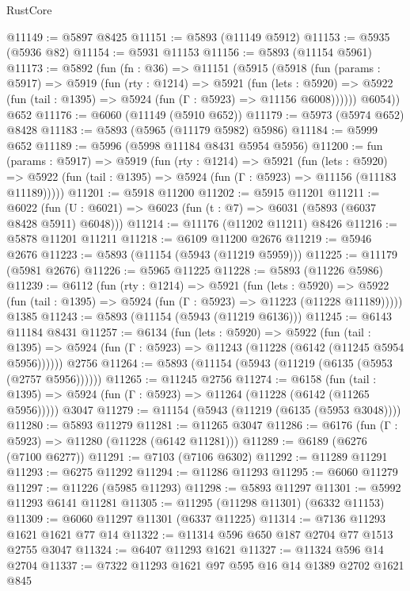 \begin{lexlean}{RustCore}
\begin{coremodule}
@11149 := @5897 @8425
@11151 := @5893 (@11149 @5912)
@11153 := @5935 (@5936 @82)
@11154 := @5931 @11153
@11156 := @5893 (@11154 @5961)
@11173 := @5892
    (fun (fn : @36) =>
    @11151
      (@5915
        (@5918
          (fun (params : @5917) =>
          @5919
            (fun (rty : @1214) =>
            @5921
              (fun (lets : @5920) =>
              @5922 (fun (tail : @1395) => @5924 (fun (Γ : @5923) => @11156 @6008))))))
        @6054))
    @652
@11176 := @6060 (@11149 (@5910 @652))
@11179 := @5973 (@5974 @652) @8428
@11183 := @5893 (@5965 (@11179 @5982) @5986)
@11184 := @5999 @652
@11189 := @5996 (@5998 @11184 @8431 @5954 @5956)
@11200 := fun (params : @5917) =>
  @5919
    (fun (rty : @1214) =>
    @5921
      (fun (lets : @5920) =>
      @5922 (fun (tail : @1395) => @5924 (fun (Γ : @5923) => @11156 (@11183 @11189)))))
@11201 := @5918 @11200
@11202 := @5915 @11201
@11211 := @6022 (fun (U : @6021) => @6023 (fun (t : @7) => @6031 (@5893 (@6037 @8428 @5911) @6048)))
@11214 := @11176 (@11202 @11211) @8426
@11216 := @5878 @11201 @11211
@11218 := @6109 @11200 @2676
@11219 := @5946 @2676
@11223 := @5893 (@11154 (@5943 (@11219 @5959)))
@11225 := @11179 (@5981 @2676)
@11226 := @5965 @11225
@11228 := @5893 (@11226 @5986)
@11239 := @6112
    (fun (rty : @1214) =>
    @5921
      (fun (lets : @5920) =>
      @5922 (fun (tail : @1395) => @5924 (fun (Γ : @5923) => @11223 (@11228 @11189)))))
    @1385
@11243 := @5893 (@11154 (@5943 (@11219 @6136)))
@11245 := @6143 @11184 @8431
@11257 := @6134
    (fun (lets : @5920) =>
    @5922
      (fun (tail : @1395) =>
      @5924 (fun (Γ : @5923) => @11243 (@11228 (@6142 (@11245 @5954 @5956))))))
    @2756
@11264 := @5893 (@11154 (@5943 (@11219 (@6135 (@5953 (@2757 @5956))))))
@11265 := @11245 @2756
@11274 := @6158
    (fun (tail : @1395) => @5924 (fun (Γ : @5923) => @11264 (@11228 (@6142 (@11265 @5956)))))
    @3047
@11279 := @11154 (@5943 (@11219 (@6135 (@5953 @3048))))
@11280 := @5893 @11279
@11281 := @11265 @3047
@11286 := @6176 (fun (Γ : @5923) => @11280 (@11228 (@6142 @11281)))
@11289 := @6189 (@6276 (@7100 @6277))
@11291 := @7103 (@7106 @6302)
@11292 := @11289 @11291
@11293 := @6275 @11292
@11294 := @11286 @11293
@11295 := @6060 @11279
@11297 := @11226 (@5985 @11293)
@11298 := @5893 @11297
@11301 := @5992 @11293 @6141 @11281
@11305 := @11295 (@11298 @11301) (@6332 @11153)
@11309 := @6060 @11297 @11301 (@6337 @11225)
@11314 := @7136 @11293 @1621 @1621 @77 @14
@11322 := @11314 @596 @650 @187 @2704 @77 @1513 @2755 @3047
@11324 := @6407 @11293 @1621
@11327 := @11324 @596 @14 @2704
@11337 := @7322 @11293 @1621 @97 @595 @16 @14 @1389 @2702 @1621 @845

\end{coremodule}
\end{lexlean}
